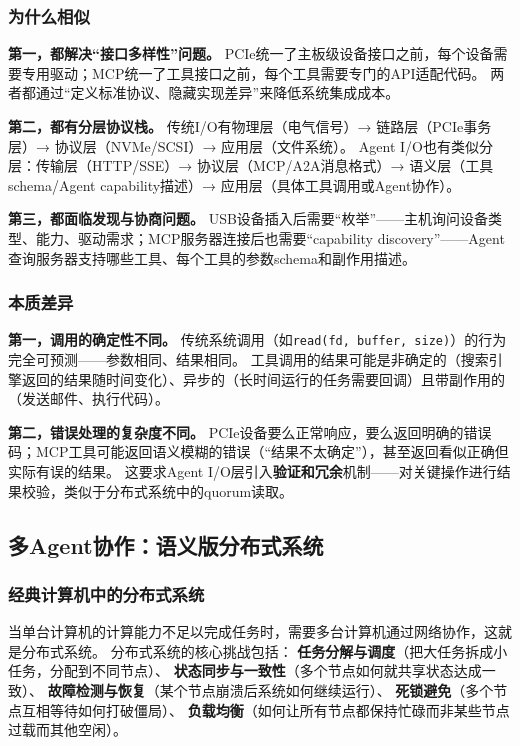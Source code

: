 \subsubsection{为什么相似}

\textbf{第一，都解决``接口多样性''问题。}
PCIe统一了主板级设备接口之前，每个设备需要专用驱动；MCP统一了工具接口之前，每个工具需要专门的API适配代码。
两者都通过``定义标准协议、隐藏实现差异''来降低系统集成成本。

\textbf{第二，都有分层协议栈。}
传统I/O有物理层（电气信号）→ 链路层（PCIe事务层）→ 协议层（NVMe/SCSI）→ 应用层（文件系统）。
Agent I/O也有类似分层：传输层（HTTP/SSE）→ 协议层（MCP/A2A消息格式）→ 语义层（工具schema/Agent capability描述）→ 应用层（具体工具调用或Agent协作）。

\textbf{第三，都面临发现与协商问题。}
USB设备插入后需要``枚举''——主机询问设备类型、能力、驱动需求；MCP服务器连接后也需要``capability discovery''——Agent查询服务器支持哪些工具、每个工具的参数schema和副作用描述。

\subsubsection{本质差异}

\textbf{第一，调用的确定性不同。}
传统系统调用（如\texttt{read(fd, buffer, size)}）的行为完全可预测——参数相同、结果相同。
工具调用的结果可能是非确定的（搜索引擎返回的结果随时间变化）、异步的（长时间运行的任务需要回调）且带副作用的（发送邮件、执行代码）。

\textbf{第二，错误处理的复杂度不同。}
PCIe设备要么正常响应，要么返回明确的错误码；MCP工具可能返回语义模糊的错误（``结果不太确定''），甚至返回看似正确但实际有误的结果。
这要求Agent I/O层引入\textbf{验证和冗余}机制——对关键操作进行结果校验，类似于分布式系统中的quorum读取。

\subsection{多Agent协作：语义版分布式系统}
\label{sec:distributed}

\subsubsection{经典计算机中的分布式系统}

当单台计算机的计算能力不足以完成任务时，需要多台计算机通过网络协作，这就是分布式系统。
分布式系统的核心挑战包括：
\textbf{任务分解与调度}（把大任务拆成小任务，分配到不同节点）、
\textbf{状态同步与一致性}（多个节点如何就共享状态达成一致）、
\textbf{故障检测与恢复}（某个节点崩溃后系统如何继续运行）、
\textbf{死锁避免}（多个节点互相等待如何打破僵局）、
\textbf{负载均衡}（如何让所有节点都保持忙碌而非某些节点过载而其他空闲）\cite{hennessy2017quantitative}。

